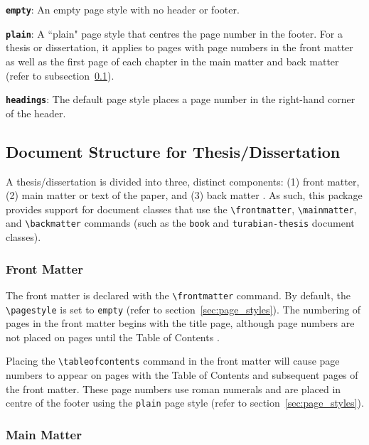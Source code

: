 \documentclass{article}
\begin{document}
\textbf{\texttt{empty}}: An empty page style with no header or footer.

\textbf{\texttt{plain}}: A ``plain" page style that centres the page number in the footer. For a thesis or dissertation, it applies to pages with page numbers in the front matter as well as the first page of each chapter in the main matter and back matter (refer to subsection~\ref{subsec:td_structure}).

\textbf{\texttt{headings}}: The default page style places a page number in the right-hand corner of the header.


\subsection{Document Structure for Thesis/Dissertation}
\label{subsec:td_structure}
A thesis/dissertation is divided into three, distinct components: (1) front matter, (2) main matter or text of the paper, and (3) back matter \autocite[375]{turabian_manual_2013}. As such, this package provides support for document classes that use the \texttt{\textbackslash frontmatter}, \texttt{\textbackslash mainmatter}, and \texttt{\textbackslash backmatter} commands (such as the \texttt{book} and \texttt{turabian-thesis} document classes).

\subsubsection*{Front Matter}

The front matter is declared with the \texttt{\textbackslash frontmatter} command. By default, the \texttt{\textbackslash pagestyle} is set to \texttt{empty} (refer to section~\ref{sec:page_styles}). The numbering of pages in the front matter begins with the title page, although page numbers are not placed on pages until the Table of Contents \autocite[373--374, 376, 380]{turabian_manual_2013}.

\clearpage
{}
Placing the \texttt{\textbackslash tableofcontents} command in the front matter will cause page numbers to appear on pages with the Table of Contents and subsequent pages of the front matter. These page numbers use roman numerals and are placed in centre of the footer \autocite[373--374]{turabian_manual_2013} using the \texttt{plain} page style (refer to section~\ref{sec:page_styles}).

\subsubsection*{Main Matter}
\end{document}
